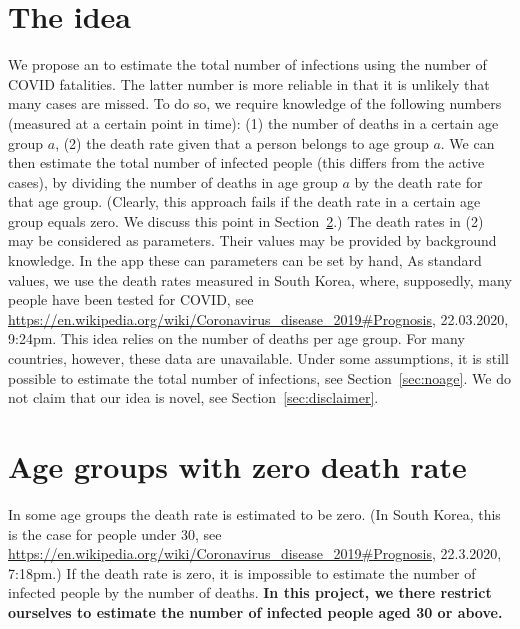 \documentclass[a4paper]{article}
\newcommand\todo[1]{{\color{red}todo: #1}}
\begin{document}
\section{The idea}
We propose an to estimate the total number of infections using the 
number of COVID fatalities. The latter number is more reliable in 
that it is unlikely that many cases are missed. To do so, 
we require knowledge of the following numbers (measured at a certain point in time):
(1) the number of deaths in a certain age group $a$,
(2) the death rate given that a person belongs to age group $a$.
We can then estimate the total number of infected people 
(this differs from the active cases),
by dividing the number of deaths in age group $a$ by the death rate for that age group. (Clearly, this approach fails if the death rate in a certain age group equals zero. We discuss this point in Section~\ref{sec:zerodeathrate}.)
The death rates in (2) may be considered as parameters.
Their values may be provided by
background knowledge. 
In the app
these can parameters can be set by hand,
As standard values, we use the death rates 
measured in South Korea, 
where, supposedly, many people have been tested for COVID,
see
\url{https://en.wikipedia.org/wiki/Coronavirus_disease_2019#Prognosis}, 22.03.2020, 9:24pm.
This idea relies on the number of deaths per age group. 
For many countries, however, 
these data are unavailable. Under some
assumptions, it is still possible to estimate the total number of infections, see Section~\ref{sec:noage}.
We do not claim that our idea is novel, see Section~\ref{sec:disclaimer}.



\section{Age groups with zero death rate} \label{sec:zerodeathrate}
In some age groups the death rate is estimated to be zero.
(In South Korea, this is the case for people under 30,
see \url{https://en.wikipedia.org/wiki/Coronavirus_disease_2019#Prognosis}, 22.3.2020, 7:18pm.)
If the death rate is zero, it is impossible 
to estimate the number of infected people by the number of deaths.
{\bf In this project, we there restrict ourselves to estimate the number
of infected people aged 30 or above.}
\end{document}

